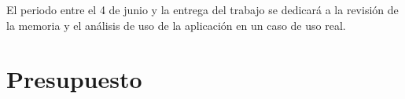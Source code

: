 El periodo entre el 4 de junio y la entrega del trabajo se dedicará a la revisión de la memoria y el análisis de uso de la aplicación en un caso de uso real.


\section{Presupuesto}











